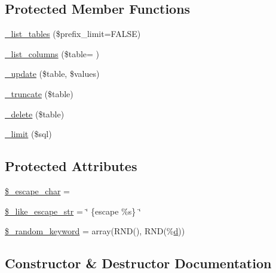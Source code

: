 \subsection*{Protected Member Functions}
\begin{DoxyCompactItemize}
\item 
\hyperlink{class_c_i___d_b__pdo__odbc__driver_a435c0f3ce54fe7daa178baa8532ebd54}{\+\_\+list\+\_\+tables} (\$prefix\+\_\+limit=F\+A\+L\+S\+E)
\item 
\hyperlink{class_c_i___d_b__pdo__odbc__driver_a2a81bb476a5c76fe6f763b0557c1e4c2}{\+\_\+list\+\_\+columns} (\$table= \textquotesingle{}\textquotesingle{})
\item 
\hyperlink{class_c_i___d_b__pdo__odbc__driver_a2540b03a93fa73ae74c10d0e16fc073e}{\+\_\+update} (\$table, \$values)
\item 
\hyperlink{class_c_i___d_b__pdo__odbc__driver_aa029600528fc1ce660a23ff4b4667f95}{\+\_\+truncate} (\$table)
\item 
\hyperlink{class_c_i___d_b__pdo__odbc__driver_a133ea8446ded52589bd22cc9163d0896}{\+\_\+delete} (\$table)
\item 
\hyperlink{class_c_i___d_b__pdo__odbc__driver_a3a02ea06541b8ecc25a33a61651562c8}{\+\_\+limit} (\$sql)
\end{DoxyCompactItemize}
\subsection*{Protected Attributes}
\begin{DoxyCompactItemize}
\item 
\hyperlink{class_c_i___d_b__pdo__odbc__driver_aaec2fb0112850159063a8e47ad3aed6e}{\$\+\_\+escape\+\_\+char} = \textquotesingle{}\textquotesingle{}
\item 
\hyperlink{class_c_i___d_b__pdo__odbc__driver_adf86ecadf3d0e1ce3f5e0eaeeb3867ae}{\$\+\_\+like\+\_\+escape\+\_\+str} = \char`\"{} \{escape \textquotesingle{}\%s\textquotesingle{}\} \char`\"{}
\item 
\hyperlink{class_c_i___d_b__pdo__odbc__driver_a10213aa6e05f6d924d3277bb1d2fea00}{\$\+\_\+random\+\_\+keyword} = array(\textquotesingle{}R\+N\+D()\textquotesingle{}, \textquotesingle{}R\+N\+D(\%\hyperlink{assets_2js_2bootstrap_8min_8js_aeb337d295abaddb5ec3cb34cc2e2bbc9}{d})\textquotesingle{})
\end{DoxyCompactItemize}


\subsection{Constructor \& Destructor Documentation}
\hypertarget{class_c_i___d_b__pdo__odbc__driver_a9162320adff1a1a4afd7f2372f753a3e}{}
